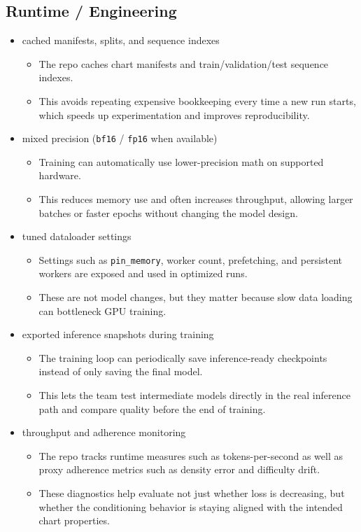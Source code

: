 \documentclass[11pt]{article}
\begin{document}
\subsection*{Runtime / Engineering}

\begin{itemize}[leftmargin=1.5em]
    \item cached manifests, splits, and sequence indexes
    \begin{itemize}[leftmargin=1.5em]
        \item The repo caches chart manifests and train/validation/test sequence indexes.
        \item This avoids repeating expensive bookkeeping every time a new run starts, which speeds up experimentation and improves reproducibility.
    \end{itemize}
    \item mixed precision (\texttt{bf16} / \texttt{fp16} when available)
    \begin{itemize}[leftmargin=1.5em]
        \item Training can automatically use lower-precision math on supported hardware.
        \item This reduces memory use and often increases throughput, allowing larger batches or faster epochs without changing the model design.
    \end{itemize}
    \item tuned dataloader settings
    \begin{itemize}[leftmargin=1.5em]
        \item Settings such as \texttt{pin\_memory}, worker count, prefetching, and persistent workers are exposed and used in optimized runs.
        \item These are not model changes, but they matter because slow data loading can bottleneck GPU training.
    \end{itemize}
    \item exported inference snapshots during training
    \begin{itemize}[leftmargin=1.5em]
        \item The training loop can periodically save inference-ready checkpoints instead of only saving the final model.
        \item This lets the team test intermediate models directly in the real inference path and compare quality before the end of training.
    \end{itemize}
    \item throughput and adherence monitoring
    \begin{itemize}[leftmargin=1.5em]
        \item The repo tracks runtime measures such as tokens-per-second as well as proxy adherence metrics such as density error and difficulty drift.
        \item These diagnostics help evaluate not just whether loss is decreasing, but whether the conditioning behavior is staying aligned with the intended chart properties.
    \end{itemize}
\end{itemize}
\end{document}
